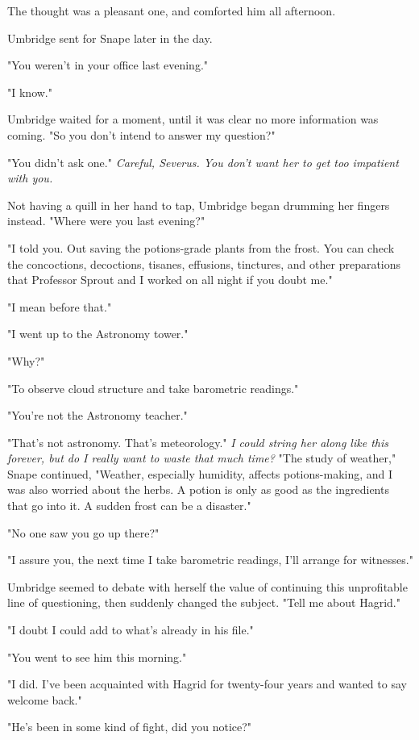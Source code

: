 \documentclass[a4paper,11pt]{article}
\begin{document}
The thought was a pleasant one, and comforted him all afternoon.

Umbridge sent for Snape later in the day.

"You weren't in your office last evening."

"I know."

Umbridge waited for a moment, until it was clear no more information was coming. "So you don't intend to answer my question?"

"You didn't ask one." \emph{Careful, Severus. You don't want her to get too impatient with you.}

Not having a quill in her hand to tap, Umbridge began drumming her fingers instead. "Where were you last evening?"

"I told you. Out saving the potions-grade plants from the frost. You can check the concoctions, decoctions, tisanes, effusions, tinctures, and other preparations that Professor Sprout and I worked on all night if you doubt me."

"I mean before that."

"I went up to the Astronomy tower."

"Why?"

"To observe cloud structure and take barometric readings."

"You're not the Astronomy teacher."

"That's not astronomy. That's meteorology." \emph{I could string her along like this forever, but do I really want to waste that much time?} "The study of weather," Snape continued, "Weather, especially humidity, affects potions-making, and I was also worried about the herbs. A potion is only as good as the ingredients that go into it. A sudden frost can be a disaster."

"No one saw you go up there?"

"I assure you, the next time I take barometric readings, I'll arrange for witnesses."

Umbridge seemed to debate with herself the value of continuing this unprofitable line of questioning, then suddenly changed the subject. "Tell me about Hagrid."

"I doubt I could add to what's already in his file."

"You went to see him this morning."

"I did. I've been acquainted with Hagrid for twenty-four years and wanted to say welcome back."

"He's been in some kind of fight, did you notice?"
\end{document}
